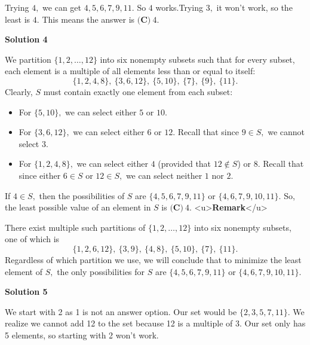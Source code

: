 \begin{enumerate}
 Trying $4,$ we can get $4,5,6,7,9,11.$ So $4$ works.Trying $3,$ it won't work, so the least is $4.$ This means the answer is $\boxed{\textbf{(C)}\ 4}.$




\textbf{Solution 4}

We partition $\{1,2,\ldots,12\}$ into six nonempty subsets such that for every subset, each element is a multiple of all elements less than or equal to itself: 
 \[\{1,2,4,8\}, \ \{3,6,12\}, \ \{5,10\}, \ \{7\}, \ \{9\}, \ \{11\}.\]Clearly, $S$ must contain exactly one element from each subset:

 
            \begin{itemize}
        \item For $\{5,10\},$ we can select either $5$ or $10.$
            \end{itemize}
            
            \begin{itemize}
        \item For $\{3,6,12\},$ we can select either $6$ or $12.$ Recall that since $9\in S,$ we cannot select $3.$
            \end{itemize}
            
            \begin{itemize}
        \item For $\{1,2,4,8\},$ we can select either $4$ (provided that $12\not\in S$) or $8.$ Recall that since either $6\in S$ or $12\in S,$ we can select neither $1$ nor $2.$
            \end{itemize}
            If $4\in S,$ then the possibilities of $S$ are $\{4,5,6,7,9,11\}$ or $\{4,6,7,9,10,11\}.$ So, the least possible value of an element in $S$ is $\boxed{\textbf{(C)}\ 4}.$
<u>\textbf{Remark}</u>

 There exist multiple such partitions of $\{1,2,\ldots,12\}$ into six nonempty subsets, one of which is 
 \[\{1,2,6,12\}, \ \{3,9\}, \ \{4,8\}, \ \{5,10\}, \ \{7\}, \ \{11\}.\]Regardless of which partition we use, we will conclude that to minimize the least element of $S,$ the only possibilities for $S$ are $\{4,5,6,7,9,11\}$ or $\{4,6,7,9,10,11\}.$




\textbf{Solution 5}

We start with 2 as 1 is not an answer option. Our set would be $\{2,3,5,7,11\}$. We realize we cannot add 12 to the set because 12 is a multiple of 3. Our set only has 5 elements, so starting with 2 won't work. 


\end{enumerate}
